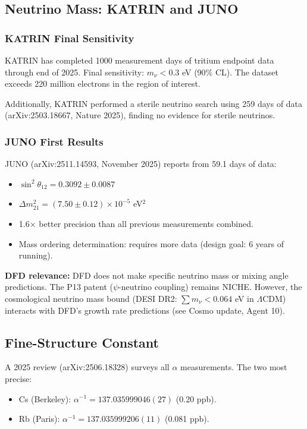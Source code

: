 \documentclass[11pt]{article}
\newcommand{\ee}[1]{\times 10^{#1}}
\newcommand{\LCDM}{$\Lambda$CDM}
\begin{document}
\subsection{Neutrino Mass: KATRIN and JUNO}

\subsubsection{KATRIN Final Sensitivity}

KATRIN has completed 1000 measurement days of tritium endpoint data
through end of 2025. Final sensitivity: $m_\nu < 0.3$ eV (90\% CL).
The dataset exceeds 220 million electrons in the region of interest.

Additionally, KATRIN performed a sterile neutrino search using 259
days of data (arXiv:2503.18667, Nature 2025), finding no evidence
for sterile neutrinos.

\subsubsection{JUNO First Results}

JUNO (arXiv:2511.14593, November 2025) reports from 59.1 days of
data:
\begin{itemize}
  \item $\sin^2\theta_{12} = 0.3092 \pm 0.0087$
  \item $\Delta m^2_{21} = (7.50 \pm 0.12)\ee{-5}$ eV$^2$
  \item 1.6$\times$ better precision than all previous measurements
    combined.
  \item Mass ordering determination: requires more data (design goal:
    6 years of running).
\end{itemize}

\textbf{DFD relevance:} DFD does not make specific neutrino mass
or mixing angle predictions. The P13 patent ($\psi$-neutrino coupling)
remains NICHE. However, the cosmological neutrino mass bound (DESI DR2:
$\sum m_\nu < 0.064$ eV in \LCDM) interacts with DFD's growth rate
predictions (see Cosmo update, Agent 10).

\subsection{Fine-Structure Constant}

A 2025 review (arXiv:2506.18328) surveys all $\alpha$ measurements.
The two most precise:
\begin{itemize}
  \item Cs (Berkeley): $\alpha^{-1} = 137.035999046(27)$ (0.20 ppb).
  \item Rb (Paris): $\alpha^{-1} = 137.035999206(11)$ (0.081 ppb).
\end{itemize}
\end{document}
